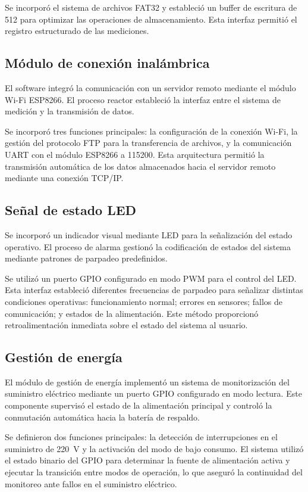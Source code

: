 Se incorporó el sistema de archivos FAT32 y estableció un buffer de escritura de \SI{512}{\byte} para optimizar las operaciones de almacenamiento. Esta interfaz permitió el registro estructurado de las mediciones.
	
\subsection{Módulo de conexión inalámbrica}

El software integró la comunicación con un servidor remoto mediante el módulo Wi-Fi ESP8266. El proceso reactor estableció la interfaz entre el sistema de medición y la transmisión de datos.

Se incorporó tres funciones principales: la configuración de la conexión Wi-Fi, la gestión del protocolo FTP para la transferencia de archivos, y la comunicación UART con el módulo ESP8266 a \SI{115200}{\baud}. Esta arquitectura permitió la transmisión automática de los datos almacenados hacia el servidor remoto mediante una conexión TCP/IP.
	
	
\subsection{Señal de estado LED}

Se incorporó un indicador visual mediante LED para la señalización del estado operativo. El proceso de alarma gestionó la codificación de estados del sistema mediante patrones de parpadeo predefinidos.

Se utilizó un puerto GPIO configurado en modo PWM para el control del LED. Esta interfaz estableció diferentes frecuencias de parpadeo para señalizar distintas condiciones operativas: funcionamiento normal; errores en sensores; fallos de comunicación; y estados de la alimentación. Este método proporcionó retroalimentación inmediata sobre el estado del sistema al usuario.
	
	
\subsection{Gestión de energía}
El módulo de gestión de energía implementó un sistema de monitorización del suministro eléctrico mediante un puerto GPIO configurado en modo lectura. Este componente supervisó el estado de la alimentación principal y controló la conmutación automática hacia la batería de respaldo.

Se definieron dos funciones principales: la detección de interrupciones en el suministro de \SI{220}{\volt} y la activación del modo de bajo consumo. El sistema utilizó el estado binario del GPIO para determinar la fuente de alimentación activa y ejecutar la transición entre modos de operación, lo que aseguró la continuidad del monitoreo ante fallos en el suministro eléctrico.
	
